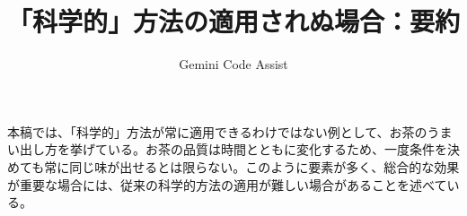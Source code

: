 \documentclass{article}
\begin{document}
\title{「科学的」方法の適用されぬ場合：要約}
\author{Gemini Code Assist}

\maketitle

本稿では、「科学的」方法が常に適用できるわけではない例として、お茶のうまい出し方を挙げている。お茶の品質は時間とともに変化するため、一度条件を決めても常に同じ味が出せるとは限らない。このように要素が多く、総合的な効果が重要な場合には、従来の科学的方法の適用が難しい場合があることを述べている。
\end{document}
